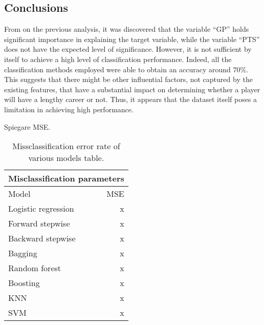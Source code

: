 \subsection{Conclusions}

From on the previous analysis, it was discovered that the variable ``GP'' holds significant importance in explaining the target variable, while the variable ``PTS'' does not have the expected level of significance. 
However, it is not sufficient by itself to achieve a high level of classification performance.
Indeed, all the classification methods employed were able to obtain an accuracy around $70\%$. This suggests that there might be other influential factors, not captured by the existing features, that have a substantial impact on determining whether a player will have a lengthy career or not. Thus, it appears that the dataset itself poses a limitation in achieving high performance.

Spiegare MSE.

\begin{table}[H]
	\centering
	\begin{tabular}{|| l | r ||} 
		\hline
		\multicolumn{2}{|c|}{Misclassification parameters} \\
		\hline
		Model & MSE \\
		\hline
		Logistic regression & x \\
		\hline
		Forward stepwise & x \\
		\hline
		Backward stepwise & x \\
		\hline
		Bagging & x \\
		\hline
		Random forest & x \\
		\hline
		Boosting & x \\
		\hline
		KNN & x \\
		\hline
		SVM & x \\
		\hline
	\end{tabular}
	\caption{Missclassification error rate of various models table.}
	\label{table:ClasEvalParams}
\end{table}

